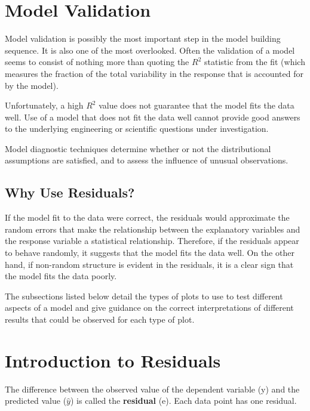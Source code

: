 \documentclass[main.tex]{subfiles}
\begin{document}
\section{Model Validation}
Model validation is possibly the most important step in the model building sequence. It is also one of the most overlooked. Often the validation of a model seems to consist of nothing more than quoting the $R^2$ statistic from the fit (which measures the fraction of the total variability in the response that is accounted for by the model). 

Unfortunately, a high $R^2$ value does not guarantee that the model fits the data well. Use of a model that does not fit the data well cannot provide good answers to the underlying engineering or scientific questions under investigation.



Model diagnostic techniques determine whether or not the distributional assumptions are satisfied, and to assess the influence of unusual observations.


\subsection{Why Use Residuals?}

If the model fit to the data were correct, the residuals would approximate the random errors that make the relationship between the explanatory variables and the response variable a statistical relationship. Therefore, if the residuals appear to behave randomly, it suggests that the model fits the data well. On the other hand, if non-random structure is evident in the residuals, it is a clear sign that the model fits the data poorly. 

The subsections listed below detail the types of plots to use to test different aspects of a model and give guidance on the correct interpretations of different results that could be observed for each type of plot.
\section{Introduction to Residuals}

The difference between the observed value of the dependent variable (y) and the predicted value ($\hat{y}$) is called the \textbf{residual} (e). Each data point has one residual.
\end{document}
